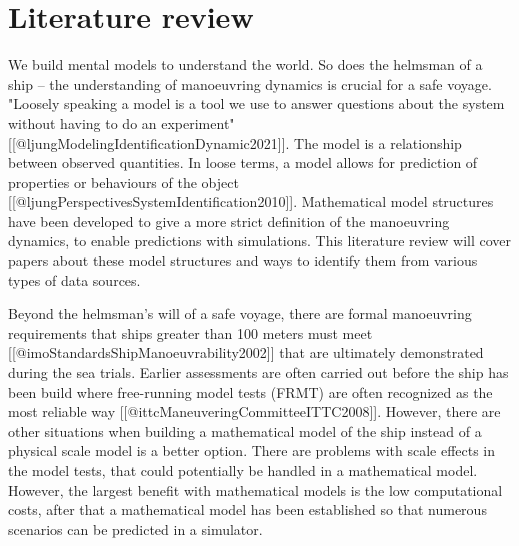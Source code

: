 \section{Literature review}
%
%
%
%
We build mental models to understand the world. So does the helmsman of a ship – the understanding of manoeuvring dynamics is crucial for a safe voyage. "Loosely speaking a model is a tool we use to answer questions about the system without having to do an experiment" \cite{ljungModelingIdentificationDynamic2021}[[@ljungModelingIdentificationDynamic2021]]. The model is a relationship between observed quantities. In loose terms, a model allows for prediction of properties or behaviours of the object [[@ljungPerspectivesSystemIdentification2010]].
Mathematical model structures have been developed to give a more strict definition of the manoeuvring dynamics, to enable predictions with simulations. This literature review will cover papers about these model structures and ways to identify them from various types of data sources.

Beyond the helmsman's will of a safe voyage, there are formal manoeuvring requirements that ships greater than 100 meters must meet  [[@imoStandardsShipManoeuvrability2002]] that are ultimately demonstrated during the sea trials. Earlier assessments are often carried out before the ship has been build where free-running model tests (FRMT) are often recognized as the most reliable way [[@ittcManeuveringCommitteeITTC2008]]. However, there are other situations when building a mathematical model of the ship instead of a physical scale model is a better option.  There are problems with scale effects in the model tests, that could potentially be handled in a mathematical model.  However, the largest benefit with mathematical models is the low  computational costs, after that a mathematical model has been established so that numerous scenarios can be predicted in a simulator.

